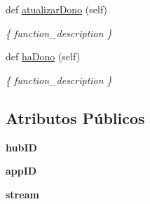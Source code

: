 \begin{DoxyCompactItemize}
def \hyperlink{classhub_para_firebase_1_1_hub_para_firebase_a7e6f7a58f211733ad2cb6d58267f3429}{atualizar\+Dono} (self)
\begin{DoxyCompactList}\small\item\em \{ function\+\_\+description \} \end{DoxyCompactList}\item 
def \hyperlink{classhub_para_firebase_1_1_hub_para_firebase_a0027a886a16cf88d366677a3cd494ea1}{ha\+Dono} (self)
\begin{DoxyCompactList}\small\item\em \{ function\+\_\+description \} \end{DoxyCompactList}\end{DoxyCompactItemize}
\subsection*{Atributos Públicos}
\begin{DoxyCompactItemize}
\item 
{\bfseries hub\+ID}\hypertarget{classhub_para_firebase_1_1_hub_para_firebase_a13968444b5703f3c8f30c7bf14de21a8}{}\label{classhub_para_firebase_1_1_hub_para_firebase_a13968444b5703f3c8f30c7bf14de21a8}

\item 
{\bfseries app\+ID}\hypertarget{classhub_para_firebase_1_1_hub_para_firebase_a6c765d09ff060cf4a06e5f4465937b52}{}\label{classhub_para_firebase_1_1_hub_para_firebase_a6c765d09ff060cf4a06e5f4465937b52}

\item 
{\bfseries stream}\hypertarget{classhub_para_firebase_1_1_hub_para_firebase_afc660542885ce7717ef17d4ddb4f9b76}{}\label{classhub_para_firebase_1_1_hub_para_firebase_afc660542885ce7717ef17d4ddb4f9b76}

\end{DoxyCompactItemize}
